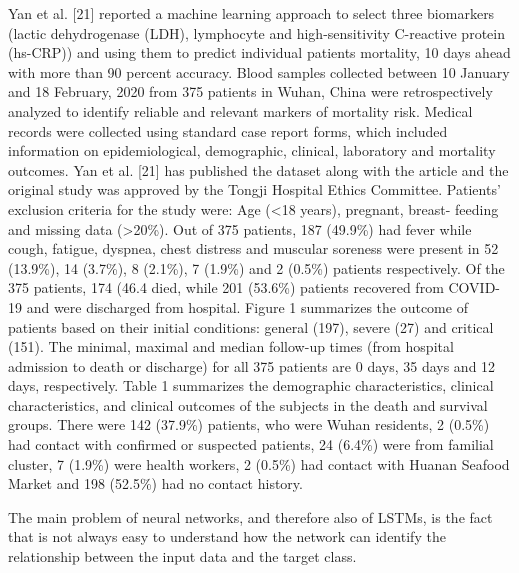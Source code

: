Yan et al. [21] reported a machine learning approach to select three biomarkers (lactic dehydrogenase (LDH), lymphocyte and high-sensitivity C-reactive protein (hs-CRP)) and using them to predict individual patients mortality, 10 days ahead with more than 90 percent accuracy. 
Blood samples collected between 10 January and 18 February, 2020 from 375 patients in Wuhan, China were retrospectively analyzed to identify reliable and relevant markers of mortality risk. Medical records were collected using standard case report forms, which included information on epidemiological, demographic, clinical, laboratory and mortality outcomes. Yan et al. [21] has published the dataset along with the article and the original study was approved by the Tongji Hospital Ethics Committee. Patients’ exclusion criteria for the study were: Age (<18 years), pregnant, breast- feeding and missing data (>20\%). Out of 375 patients, 187 (49.9\%) had fever while cough, fatigue, dyspnea, chest distress and muscular soreness were present in 52 (13.9\%), 14 (3.7\%), 8 (2.1\%), 7 (1.9\%) and 2 (0.5\%) patients respectively.
Of the 375 patients, 174 (46.4\) died, while 201 (53.6\%) patients recovered from COVID-19 and were discharged from hospital. Figure 1 summarizes the outcome of patients based on their initial conditions: general (197), severe (27) and critical (151). The minimal, maximal and median follow-up times (from hospital admission to death or discharge) for all 375 patients are 0 days, 35 days and 12 days, respectively.
Table 1 summarizes the demographic characteristics, clinical characteristics, and clinical outcomes of the subjects in the death and survival groups. There were 142 (37.9\%) patients, who were Wuhan residents, 2 (0.5\%) had contact with confirmed or suspected patients, 24 (6.4\%) were from familial cluster, 7 (1.9\%) were health workers, 2 (0.5\%) had contact with Huanan Seafood Market and 198 (52.5\%) had no contact history.

The main problem of neural networks, and therefore also of LSTMs, is the fact that is not always easy to understand how the network can identify the relationship between the input data and the target class.
\fi

